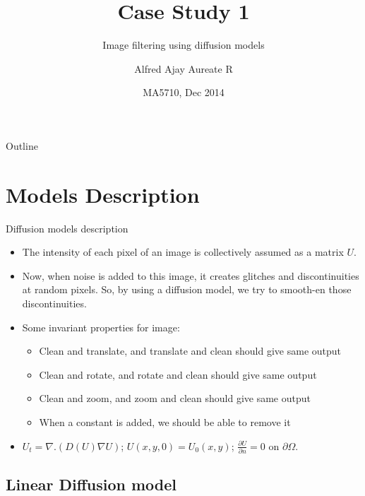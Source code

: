 \documentclass{beamer}
\title{Case Study 1}
\subtitle{Image filtering using diffusion models}
\author{Alfred Ajay Aureate R\inst{1}}
\institute[IITM] %
{
  \inst{1}%
  EE10B052\\
  Department of Electrical Engineering\\
  Indian Institute of Technology Madras}
\date{MA5710, Dec 2014}
\begin{document}
\begin{frame}
  \titlepage
\end{frame}

\begin{frame}{Outline}
  \tableofcontents
\end{frame}

\section{Models Description}

\begin{frame}{Diffusion models description}{}
  \begin{itemize}
  \item {
    The intensity of each pixel of an image is collectively assumed as a matrix $U$.
    \pause
  }
  \item {
    Now, when noise is added to this image, it creates glitches and discontinuities at random pixels. So, by using a diffusion model, we try to smooth-en those discontinuities.
    \pause
  }
  \item {
    Some invariant properties for image:
    \begin{itemize}
    \item {Clean and translate, and translate and clean should give same output}
    \item {Clean and rotate, and rotate and clean should give same output}
    \item {Clean and zoom, and zoom and clean should give same output}
    \item {When a constant is added, we should be able to remove it}
    \end{itemize}
    \pause
  }
  \item {
    $U_{t}=\nabla.\left(D\left(U\right)\nabla U\right)$; $U\left(x,y,0\right)=U_{0}\left(x,y\right)$;
$\frac{\partial U}{\partial n}=0$ on $\partial\Omega$.
  }
  \end{itemize}
\end{frame}

\subsection{Linear Diffusion model}
\end{document}

